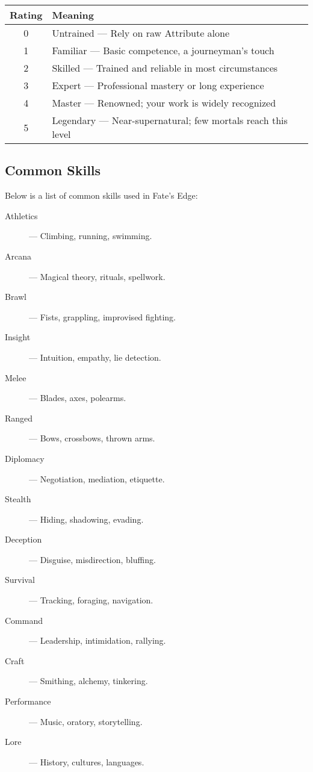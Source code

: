 \begin{center}
\begin{tabular}{cl}
\toprule
\textbf{Rating} & \textbf{Meaning} \\
\midrule
0 & Untrained — Rely on raw Attribute alone \\
1 & Familiar — Basic competence, a journeyman’s touch \\
2 & Skilled — Trained and reliable in most circumstances \\
3 & Expert — Professional mastery or long experience \\
4 & Master — Renowned; your work is widely recognized \\
5 & Legendary — Near-supernatural; few mortals reach this level \\
\bottomrule
\end{tabular}
\end{center}

\subsection*{Common Skills}

Below is a list of common skills used in Fate’s Edge:

\begin{description}
  \item[Athletics] — Climbing, running, swimming.
  \item[Arcana] — Magical theory, rituals, spellwork.
  \item[Brawl] — Fists, grappling, improvised fighting.
  \item[Insight] — Intuition, empathy, lie detection.
  \item[Melee] — Blades, axes, polearms.
  \item[Ranged] — Bows, crossbows, thrown arms.
  \item[Diplomacy] — Negotiation, mediation, etiquette.
  \item[Stealth] — Hiding, shadowing, evading.
  \item[Deception] — Disguise, misdirection, bluffing.
  \item[Survival] — Tracking, foraging, navigation.
  \item[Command] — Leadership, intimidation, rallying.
  \item[Craft] — Smithing, alchemy, tinkering.
  \item[Performance] — Music, oratory, storytelling.
  \item[Lore] — History, cultures, languages.
\end{description}

